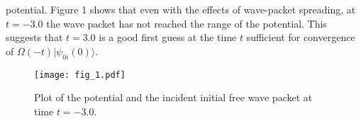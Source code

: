 \documentclass[aps,prc,reprint,noshowpacs,groupedaddress,onecolumn]{revtex4}
\begin{document}
potential.
%
Figure 1 shows that even with the effects of wave-packet
spreading, at $t=-3.0$ the wave packet has not reached the range of
the potential.  This suggests that $t=3.0$ is a good first guess at
the time $t$ sufficient for convergence of
$\Omega(-t)\vert \psi_{0i}(0) \rangle$.


\begin{figure}
\centering
\caption{Plot of the potential and the incident initial free wave packet
at time $t=-3.0$.}
\texttt{[image: fig\_1.pdf]}
\label{figure 1}
\end{figure}  
\end{document}
